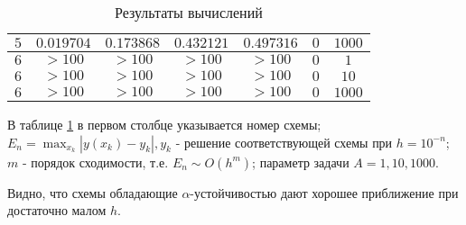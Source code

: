 \documentclass[14pt,a4paper]{extarticle}
\newcommand{\1}{\mathbbm{1}}
\begin{document}
\begin{table}[h!]
\begin{center}
\begin{tabular}{|c|c|c|c|c|c|c|}
     $5$ &  $0.019704$ & $0.173868$ & $0.432121$ & $0.497316$ & $0$ & $1000$ \\ \hline 
    
     $6$ &  $>100$ & $>100$ & $>100$ & $>100$ & $0$ & $1$ \\ \hline 
    
     $6$ &  $>100$ & $>100$ & $>100$ & $>100$ & $0$ & $10$ \\ \hline 
    
     $6$ &  $>100$ & $>100$ & $>100$ & $>100$ & $0$ & $1000$ \\ \hline 
    \end{tabular} 
    \end{center}\caption{Результаты вычислений}  
    \label{Aggreg1CU} \end{table} 
     
     
     

    В таблице \ref{Aggreg1CU} в первом столбце указывается номер схемы;
    $E_n=\max _{x_k}\left|y\left(x_k\right)-y_k\right|, y_k$ 
    - решение соответствующей схемы при $h=10^{-n}$; $m$ - порядок сходимости, т.е. $E_n \sim O\left(h^m\right)$;
    параметр задачи $A=1,10,1000$. 
    \par
    Видно, что схемы обладающие $\alpha$-устойчивостью дают хорошее приближение при достаточно малом $h$. 
     
     
\end{document}
